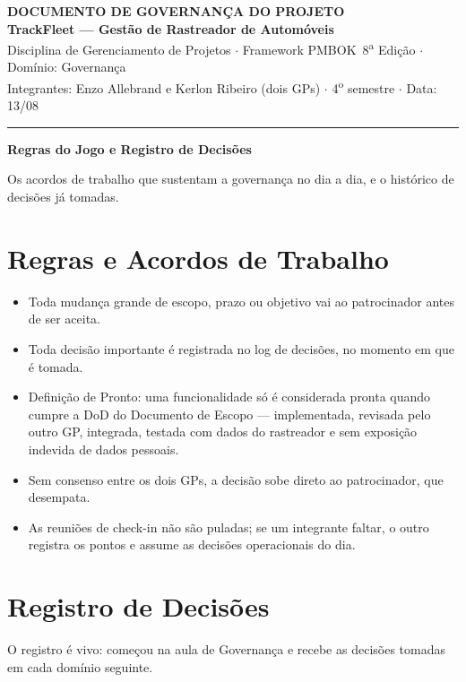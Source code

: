 \documentclass[11pt,a4paper]{article}
\newcommand{\cabecalho}[3]{%
  \begin{center}
  {\Large\bfseries DOCUMENTO DE #1 DO PROJETO}\\[2pt]
  {\large\bfseries TrackFleet --- Gestão de Rastreador de Automóveis}\\[4pt]
  Disciplina de Gerenciamento de Projetos $\cdot$ Framework PMBOK\textregistered\ 8\textsuperscript{a} Edição $\cdot$ Domínio: #2\\[2pt]
  Integrantes: Enzo Allebrand e Kerlon Ribeiro (dois GPs) $\cdot$ 4\textsuperscript{o} semestre $\cdot$ Data: #3
  \end{center}
  \vspace{2mm}\hrule\vspace{4mm}}
\newcommand{\parte}[1]{\noindent\textbf{\large #1}\par\vspace{1mm}}
\begin{document}
\cabecalho{GOVERNANÇA}{Governança}{13/08}

\parte{Regras do Jogo e Registro de Decisões}
\noindent Os acordos de trabalho que sustentam a governança no dia a dia, e o histórico de decisões já tomadas.

\section{Regras e Acordos de Trabalho}
\begin{itemize}[itemsep=3pt]
  \item Toda mudança grande de escopo, prazo ou objetivo vai ao patrocinador antes de ser aceita.
  \item Toda decisão importante é registrada no log de decisões, no momento em que é tomada.
  \item Definição de Pronto: uma funcionalidade só é considerada pronta quando cumpre a DoD do Documento de Escopo --- implementada, revisada pelo outro GP, integrada, testada com dados do rastreador e sem exposição indevida de dados pessoais.
  \item Sem consenso entre os dois GPs, a decisão sobe direto ao patrocinador, que desempata.
  \item As reuniões de check-in não são puladas; se um integrante faltar, o outro registra os pontos e assume as decisões operacionais do dia.
\end{itemize}

\section{Registro de Decisões}
O registro é vivo: começou na aula de Governança e recebe as decisões tomadas em cada domínio seguinte.
\end{document}
